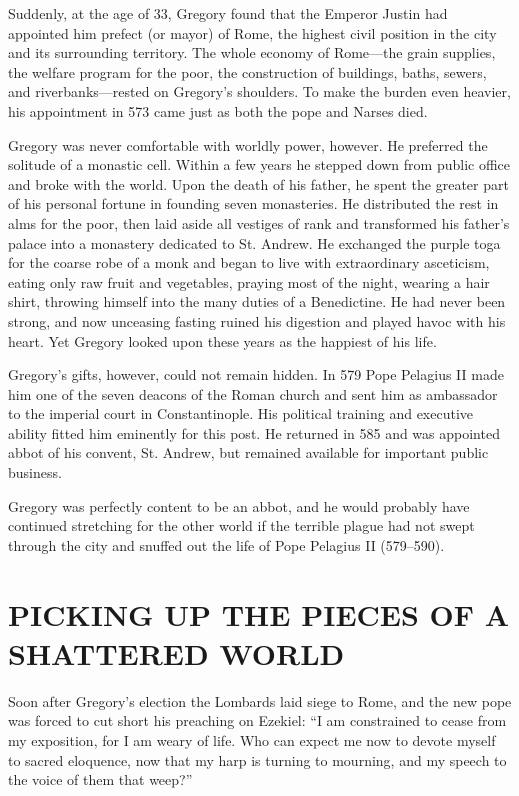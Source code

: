 Suddenly, at the age of 33, Gregory found that the Emperor Justin had appointed him prefect (or
mayor) of Rome, the highest civil position in the city and its surrounding territory. The whole
economy of Rome—the grain supplies, the welfare program for the poor, the construction of buildings,
baths, sewers, and riverbanks—rested on Gregory’s shoulders. To make the burden even heavier, his
appointment in 573 came just as both the pope and Narses died.

Gregory was never comfortable with worldly power, however. He preferred the solitude of a monastic
cell. Within a few years he stepped down from public office and broke with the world. Upon the death
of his father, he spent the greater part of his personal fortune in founding seven monasteries. He
distributed the rest in alms for the poor, then laid aside all vestiges of rank and transformed his
father’s palace into a monastery dedicated to St. Andrew. He exchanged the purple toga for the
coarse robe of a monk and began to live with extraordinary asceticism, eating only raw fruit and
vegetables, praying most of the night, wearing a hair shirt, throwing himself into the many duties
of a Benedictine. He had never been strong, and now unceasing fasting ruined his digestion and
played havoc with his heart. Yet Gregory looked upon these years as the happiest of his life.

Gregory’s gifts, however, could not remain hidden. In 579 Pope Pelagius II made him one of the seven
deacons of the Roman church and sent him as ambassador to the imperial court in Constantinople. His
political training and executive ability fitted him eminently for this post. He returned in 585 and
was appointed abbot of his convent, St. Andrew, but remained available for important public
business.

Gregory was perfectly content to be an abbot, and he would probably have continued stretching for
the other world if the terrible plague had not swept through the city and snuffed out the life of
Pope Pelagius II (579–590).

\section{PICKING UP THE PIECES OF A SHATTERED WORLD}

Soon after Gregory’s election the Lombards laid siege to Rome, and the new pope was forced to cut
short his preaching on Ezekiel: “I am constrained to cease from my exposition, for I am weary of
life. Who can expect me now to devote myself to sacred eloquence, now that my harp is turning to
mourning, and my speech to the voice of them that weep?”

